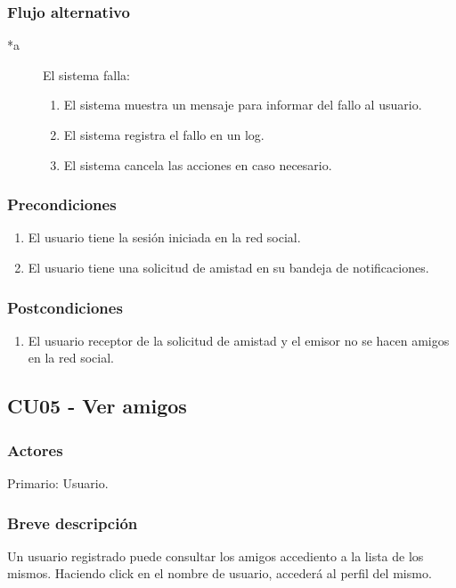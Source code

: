 \documentclass[12pt, a4paper, titlepage]{article}
\begin{document}
\subsubsection{Flujo alternativo}
\begin{description}
	\item [*a] El sistema falla:
	\begin{enumerate}
		\item El sistema muestra un mensaje para informar del fallo al usuario.
		\item El sistema registra el fallo en un log.
		\item El sistema cancela las acciones en caso necesario.
	\end{enumerate}
\end{description}

\subsubsection{Precondiciones}
\begin{enumerate}
	\item El usuario tiene la sesión iniciada en la red social.
	\item El usuario tiene una solicitud de amistad en su bandeja de notificaciones.
\end{enumerate}
\subsubsection{Postcondiciones}
\begin{enumerate}
	\item El usuario receptor de la solicitud de amistad y el emisor no se hacen amigos en la red social.
\end{enumerate}


\subsection{CU05 - Ver amigos}
\subsubsection{Actores}
Primario: Usuario.
\subsubsection{Breve descripción}
Un usuario registrado puede consultar los amigos accediento a la lista de los mismos. Haciendo click en el nombre de usuario, accederá al perfil del mismo.
\end{document}
